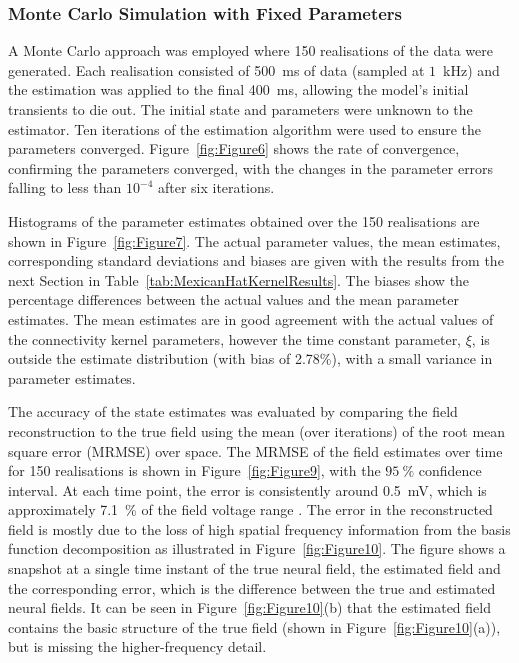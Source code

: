 \documentclass[12pt]{iopart}
\begin{document}
\subsubsection{Monte Carlo Simulation with Fixed Parameters}
A Monte Carlo approach was employed where 150 realisations of the data were generated. Each realisation consisted of 500~ms of data (sampled at $1$~kHz) and the estimation was applied to the final 400~ms, allowing the model's initial transients to die out. The initial state and parameters were unknown to the estimator. Ten iterations of the estimation algorithm were used to ensure the parameters converged. Figure~\ref{fig:Figure6} shows the rate of convergence, confirming the parameters converged, with the changes in the parameter errors falling to less than $10^{-4}$ after six iterations.

Histograms of the parameter estimates obtained over the 150 realisations are shown in Figure~\ref{fig:Figure7}. The actual parameter values, the mean estimates, corresponding standard deviations and biases are given with the results from the next Section in Table~\ref{tab:MexicanHatKernelResults}. The biases show the percentage differences between the actual values and the mean parameter estimates. The mean estimates are in good agreement with the actual values of the connectivity kernel parameters, however the time constant parameter, $\xi$, is outside the estimate distribution (with bias of 2.78\%), with a small variance in parameter estimates.

The accuracy of the state estimates was evaluated by comparing the field reconstruction to the true field using the mean (over iterations) of the root mean square error (MRMSE) over space. The MRMSE of the field estimates over time for 150 realisations is shown in Figure~\ref{fig:Figure9}, with the $95~\%$ confidence interval. At each time point, the error is consistently around 0.5~mV, which is approximately 7.1~\% of the field voltage range . The error in the reconstructed field is mostly due to the loss of high spatial frequency information from the basis function decomposition as illustrated in Figure~\ref{fig:Figure10}. The figure shows a snapshot at a single time instant of the true neural field, the estimated field and the corresponding error, which is the difference between the true and estimated neural fields. It can be seen in Figure~\ref{fig:Figure10}(b) that the estimated field contains the basic structure of the true field (shown in Figure~\ref{fig:Figure10}(a)), but is missing the higher-frequency detail.
\end{document}
